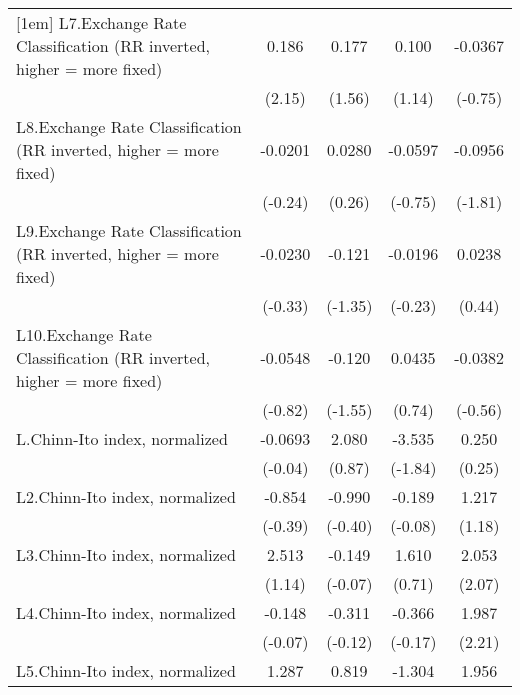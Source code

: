 {\begin{longtable}{l*{4}{c}}
[1em]
L7.Exchange Rate Classification (RR inverted, higher = more fixed)&    0.186\sym{*}  &    0.177         &    0.100         &  -0.0367         \\
                &   (2.15)         &   (1.56)         &   (1.14)         &  (-0.75)         \\
[1em]
L8.Exchange Rate Classification (RR inverted, higher = more fixed)&  -0.0201         &   0.0280         &  -0.0597         &  -0.0956         \\
                &  (-0.24)         &   (0.26)         &  (-0.75)         &  (-1.81)         \\
[1em]
L9.Exchange Rate Classification (RR inverted, higher = more fixed)&  -0.0230         &   -0.121         &  -0.0196         &   0.0238         \\
                &  (-0.33)         &  (-1.35)         &  (-0.23)         &   (0.44)         \\
[1em]
L10.Exchange Rate Classification (RR inverted, higher = more fixed)&  -0.0548         &   -0.120         &   0.0435         &  -0.0382         \\
                &  (-0.82)         &  (-1.55)         &   (0.74)         &  (-0.56)         \\
[1em]
L.Chinn-Ito index, normalized&  -0.0693         &    2.080         &   -3.535         &    0.250         \\
                &  (-0.04)         &   (0.87)         &  (-1.84)         &   (0.25)         \\
[1em]
L2.Chinn-Ito index, normalized&   -0.854         &   -0.990         &   -0.189         &    1.217         \\
                &  (-0.39)         &  (-0.40)         &  (-0.08)         &   (1.18)         \\
[1em]
L3.Chinn-Ito index, normalized&    2.513         &   -0.149         &    1.610         &    2.053\sym{*}  \\
                &   (1.14)         &  (-0.07)         &   (0.71)         &   (2.07)         \\
[1em]
L4.Chinn-Ito index, normalized&   -0.148         &   -0.311         &   -0.366         &    1.987\sym{*}  \\
                &  (-0.07)         &  (-0.12)         &  (-0.17)         &   (2.21)         \\
[1em]
L5.Chinn-Ito index, normalized&    1.287         &    0.819         &   -1.304         &    1.956         \\

\end{longtable}}
